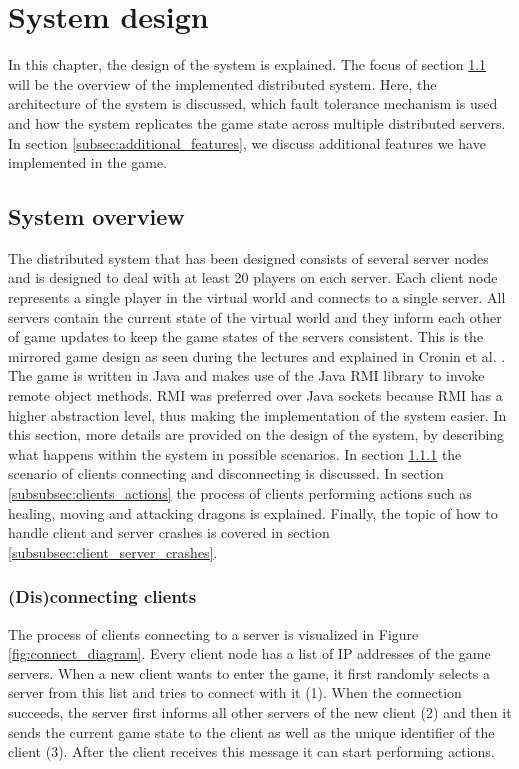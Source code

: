 \section{System design}
\label{sec:design}
In this chapter, the design of the system is explained. The focus of section \ref{subsec:system_overview} will be the overview of the implemented distributed system.
Here, the architecture of the system is discussed, which fault tolerance mechanism is used and how the system replicates the game state across multiple distributed servers. 
In section \ref{subsec:additional_features}, we discuss additional features we have implemented in the game.

\subsection{System overview}
\label{subsec:system_overview}
The distributed system that has been designed consists of several server nodes and is designed to deal with at least 20 players on each server. 
Each client node represents a single player in the virtual world and connects to a single server.
All servers contain the current state of the virtual world and they inform each other of game updates to keep the game states of the servers consistent. 
This is the mirrored game design as seen during the lectures and explained in Cronin et al. \cite{cronin2002efficient}.
The game is written in Java and makes use of the Java RMI library to invoke remote object methods. RMI was preferred over Java sockets because RMI has a higher abstraction level, thus making the implementation of the system easier. 
In this section, more details are provided on the design of the system, by describing what happens within the system in possible scenarios. 
In section \ref{subsubsec:disconnecting_clients} the scenario of clients connecting and disconnecting is discussed. 
In section \ref{subsubsec:clients_actions} the process of clients performing actions such as healing, moving and attacking dragons is explained. 
Finally, the topic of how to handle client and server crashes is covered in section \ref{subsubsec:client_server_crashes}.

\subsubsection{(Dis)connecting clients}
\label{subsubsec:disconnecting_clients}
The process of clients connecting to a server is visualized in Figure \ref{fig:connect_diagram}. 
Every client node has a list of IP addresses of the game servers. When a new client wants to enter the game, it first randomly selects a server from this list and tries to connect with it (1). 
When the connection succeeds, the server first informs all other servers of the new client (2) and then it sends the current game state to the client as well as the unique identifier of the client (3). 
After the client receives this message it can start performing actions.

